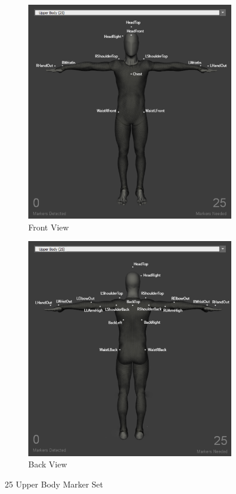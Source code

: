 \begin{figure}[h]
    \centering
    \begin{subfigure}[b]{0.45\columnwidth}
        \includegraphics[width=\textwidth]{images/skleton.png}
        \caption{Front View }
        \label{fig:opti1}
    \end{subfigure}
    \begin{subfigure}[b]{0.45\columnwidth}
        \includegraphics[width=\textwidth]{images/skeleton2.png}
        \caption{Back View }
        \label{fig:opti2}
    \end{subfigure}
    \caption{25 Upper Body Marker Set}
    \label{fig:opti3}
\end{figure}




